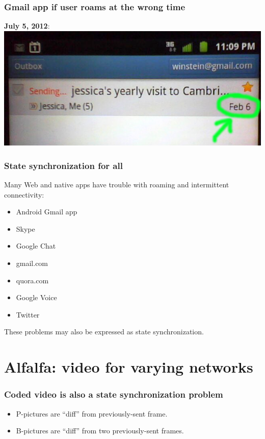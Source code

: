 \documentclass[svgnames]{beamer}
\begin{document}
\begin{frame}
\frametitle{Gmail app if user roams at the wrong time}

\textbf{July 5, 2012}:\\
\includegraphics[scale=.5]{gmail.png}

\end{frame}

\begin{frame}
\frametitle{State synchronization for all}

Many Web and native apps have trouble with roaming and intermittent connectivity:

\begin{itemize}
\item Android Gmail app
\item Skype
\item Google Chat
\item gmail.com
\item quora.com
\item Google Voice
\item Twitter
\end{itemize}

These problems may also be expressed as state synchronization.

\end{frame}

\section{Alfalfa: video for varying networks}

\begin{frame}
\tableofcontents[currentsection]
\end{frame}

\begin{frame}
\frametitle{Coded video is also a state synchronization problem}

\begin{itemize}

\item P-pictures are ``diff'' from previously-sent frame.

\item B-pictures are ``diff'' from two previously-sent frames.

\end{itemize}

\end{frame}
\end{document}
